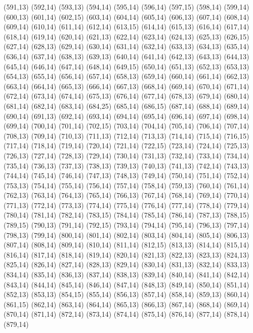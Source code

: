 (591,13)
(592,14)
(593,13)
(594,14)
(595,14)
(596,14)
(597,15)
(598,14)
(599,14)
(600,13)
(601,14)
(602,15)
(603,14)
(604,14)
(605,14)
(606,13)
(607,14)
(608,14)
(609,14)
(610,14)
(611,14)
(612,14)
(613,15)
(614,14)
(615,13)
(616,14)
(617,14)
(618,14)
(619,14)
(620,14)
(621,13)
(622,14)
(623,14)
(624,13)
(625,13)
(626,15)
(627,14)
(628,13)
(629,14)
(630,14)
(631,14)
(632,14)
(633,13)
(634,13)
(635,14)
(636,14)
(637,14)
(638,13)
(639,13)
(640,14)
(641,14)
(642,13)
(643,13)
(644,13)
(645,14)
(646,14)
(647,14)
(648,14)
(649,15)
(650,14)
(651,13)
(652,13)
(653,13)
(654,13)
(655,14)
(656,14)
(657,14)
(658,13)
(659,14)
(660,14)
(661,14)
(662,13)
(663,14)
(664,14)
(665,13)
(666,14)
(667,13)
(668,14)
(669,14)
(670,14)
(671,14)
(672,14)
(673,14)
(674,14)
(675,13)
(676,14)
(677,14)
(678,13)
(679,14)
(680,14)
(681,14)
(682,14)
(683,14)
(684,25)
(685,14)
(686,15)
(687,14)
(688,14)
(689,14)
(690,14)
(691,13)
(692,14)
(693,14)
(694,14)
(695,14)
(696,14)
(697,14)
(698,14)
(699,14)
(700,14)
(701,14)
(702,15)
(703,14)
(704,14)
(705,14)
(706,14)
(707,14)
(708,13)
(709,14)
(710,13)
(711,13)
(712,14)
(713,13)
(714,14)
(715,14)
(716,15)
(717,14)
(718,14)
(719,14)
(720,14)
(721,14)
(722,15)
(723,14)
(724,14)
(725,13)
(726,13)
(727,14)
(728,13)
(729,14)
(730,14)
(731,13)
(732,14)
(733,14)
(734,14)
(735,14)
(736,13)
(737,13)
(738,13)
(739,13)
(740,13)
(741,13)
(742,14)
(743,13)
(744,14)
(745,14)
(746,14)
(747,13)
(748,13)
(749,14)
(750,14)
(751,14)
(752,14)
(753,13)
(754,14)
(755,14)
(756,14)
(757,14)
(758,14)
(759,13)
(760,14)
(761,14)
(762,13)
(763,14)
(764,13)
(765,14)
(766,13)
(767,14)
(768,14)
(769,14)
(770,14)
(771,13)
(772,14)
(773,13)
(774,14)
(775,14)
(776,14)
(777,14)
(778,14)
(779,14)
(780,14)
(781,14)
(782,14)
(783,15)
(784,14)
(785,14)
(786,14)
(787,13)
(788,15)
(789,15)
(790,13)
(791,14)
(792,15)
(793,14)
(794,14)
(795,14)
(796,13)
(797,14)
(798,13)
(799,14)
(800,14)
(801,14)
(802,14)
(803,14)
(804,14)
(805,14)
(806,13)
(807,14)
(808,14)
(809,14)
(810,14)
(811,14)
(812,15)
(813,13)
(814,14)
(815,14)
(816,14)
(817,14)
(818,14)
(819,14)
(820,14)
(821,13)
(822,13)
(823,13)
(824,13)
(825,14)
(826,14)
(827,14)
(828,13)
(829,14)
(830,14)
(831,13)
(832,14)
(833,13)
(834,14)
(835,14)
(836,13)
(837,14)
(838,13)
(839,14)
(840,14)
(841,14)
(842,14)
(843,14)
(844,14)
(845,14)
(846,14)
(847,14)
(848,13)
(849,14)
(850,14)
(851,14)
(852,13)
(853,13)
(854,15)
(855,14)
(856,13)
(857,14)
(858,14)
(859,13)
(860,14)
(861,15)
(862,14)
(863,14)
(864,14)
(865,13)
(866,13)
(867,14)
(868,14)
(869,14)
(870,14)
(871,14)
(872,14)
(873,14)
(874,14)
(875,14)
(876,14)
(877,14)
(878,14)
(879,14)
